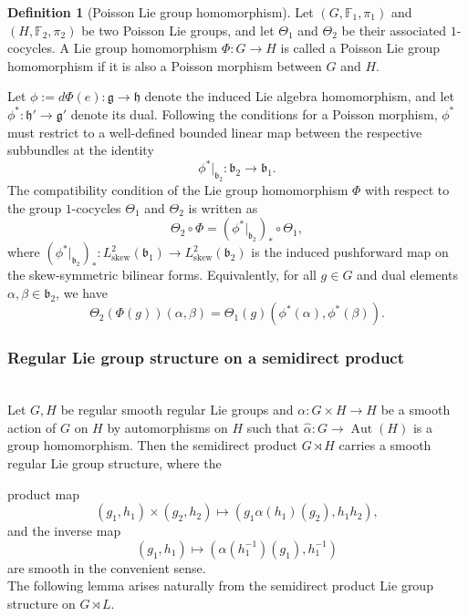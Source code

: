 \documentclass[11pt,reqno]{amsart}
\theoremstyle{definition}
\newtheorem{definition}[theorem]{Definition}
\numberwithin{equation}{section}
\begin{document}
\begin{definition}[Poisson Lie group homomorphism]\label{poissonhom}\label{Cocycle compatibility}
Let $(G, \mathbb{F}_1, \pi_1)$ and $(H, \mathbb{F}_2, \pi_2)$ be two Poisson Lie groups, and let $\Theta_1$ and $\Theta_2$ be their associated $1$-cocycles. A Lie group homomorphism $\Phi: G \to H$ is called a Poisson Lie group homomorphism if it is also a Poisson morphism between $G$ and $H$. 

Let $\phi := d\Phi(e) : \mathfrak{g} \to \mathfrak{h}$ denote the induced Lie algebra homomorphism, and let $\phi^*: \mathfrak{h}' \to \mathfrak{g}'$ denote its dual. Following the conditions for a Poisson morphism, $\phi^*$ must restrict to a well-defined bounded linear map between the respective subbundles at the identity
\[
\phi^*|_{\mathfrak{b}_2}: \mathfrak{b}_2 \to \mathfrak{b}_1.
\]
The compatibility condition of the Lie group homomorphism $\Phi$ with respect to the group $1$-cocycles $\Theta_1$ and $\Theta_2$ is written as
\begin{equation}  
\Theta_2 \circ \Phi = (\phi^*|_{\mathfrak{b}_2})_* \circ \Theta_1,
\end{equation} 
where $(\phi^*|_{\mathfrak{b}_2})_*: L^2_{\text{skew}}(\mathfrak{b}_1) \to L^2_{\text{skew}}(\mathfrak{b}_2)$ is the induced pushforward map on the skew-symmetric bilinear forms. Equivalently, for all $g \in G$ and dual elements $\alpha, \beta \in \mathfrak{b}_2$, we have
\[
\Theta_2(\Phi(g))(\alpha, \beta) = \Theta_1(g)(\phi^*(\alpha), \phi^*(\beta)).
\]
\end{definition}
\subsubsection{Regular Lie group structure on a semidirect product }\cite[section 5.8]{20} \label{regularsemidirect}\\
Let $G, H$ be regular smooth regular Lie groups and $\alpha : G\times H\to H$ be a smooth action of $G$ on $H$ by automorphisms on $H$ such that $\hat{\alpha}: G\to \operatorname{Aut}(H)$ is a group homomorphism. Then the semidirect product $G \rtimes H$ carries a smooth regular Lie group structure, where the 

product map \[(g_1, h_1) \times (g_2, h_2) \mapsto (g_1\alpha(h_1)(g_2), h_1h_2),\] and the inverse map \[(g_1, h_1) \mapsto (\alpha(h_1^{-1})(g_1), h_1^{-1})\] are smooth in the convenient sense. \\

 The following lemma arises naturally from the semidirect product Lie group structure on $G \rtimes L$.
\end{document}
